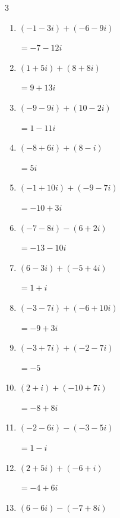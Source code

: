 \begin{multicols}{3}
\begin{enumerate}
        $\displaystyle =13-12i$

\columnbreak %

\resetques

  \item $\displaystyle (-1-3i) + (-6-9i)$

        $\displaystyle =-7-12i$

  \item $\displaystyle (1+5i) + (8+8i)$

        $\displaystyle =9+13i$

  \item $\displaystyle (-9-9i) + (10-2i)$

        $\displaystyle =1-11i$

  \item $\displaystyle (-8+6i) + (8-i)$

        $\displaystyle =5i$

  \item $\displaystyle (-1+10i) + (-9-7i)$

        $\displaystyle =-10+3i$

  \item $\displaystyle (-7-8i) - (6+2i)$

        $\displaystyle =-13-10i$

  \item $\displaystyle (6-3i) + (-5+4i)$

        $\displaystyle =1+i$

  \item $\displaystyle (-3-7i) + (-6+10i)$

        $\displaystyle =-9+3i$

  \item $\displaystyle (-3+7i) + (-2-7i)$

        $\displaystyle =-5$

  \item $\displaystyle (2+i) + (-10+7i)$

        $\displaystyle =-8+8i$

  \item $\displaystyle (-2-6i) - (-3-5i)$

        $\displaystyle =1-i$

  \item $\displaystyle (2+5i) + (-6+i)$

        $\displaystyle =-4+6i$

  \item $\displaystyle (6-6i) - (-7+8i)$


\end{enumerate}
\end{multicols}
